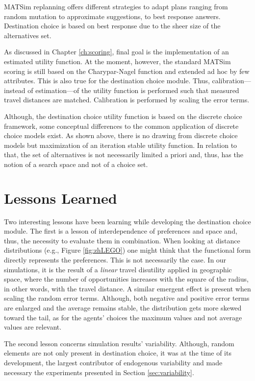 MATSim replanning offers different strategies to adapt plans ranging from random mutation to approximate suggestions, to best response answers. Destination choice is based on best response due to the sheer size of the alternatives set. 

As discussed in Chapter \ref{ch:scoring}, final goal is the implementation of an estimated utility function. At the moment, however, the standard MATSim scoring is still based on the Charypar-Nagel function and extended ad hoc by few attributes. This is also true for the destination choice module. Thus, calibration---instead of estimation---of the utility function is performed such that measured travel distances are matched. Calibration is performed by scaling the error terms. 

Although, the destination choice utility function is based on the discrete choice framework, some conceptual differences to the common application of discrete choice models exist. As shown above, there is no drawing from discrete choice models but maximization of an iteration stable utility function. In relation to that, the set of alternatives is not necessarily limited a priori and, thus, has the notion of a search space and not of a choice set.

\section{Lessons Learned}
Two interesting lessons have been learning while developing the destination choice module. The first is a lesson of interdependence of preferences and space and,  thus, the necessity to evaluate them in combination. When looking at distance distributions (e.g., Figure \ref{fig:zhLEGO}) one might think that the functional form directly represents the preferences. This is not necessarily the case. In our simulations, it is the result of a \emph{linear} travel disutility applied in geographic space, where the number of opportunities increases with the square of the radius, in other words, with the travel distance. A similar emergent effect is present when scaling the random error terms. Although, both negative and positive error terms are enlarged and the average remains stable, the distribution gets more skewed toward the tail, as for the agents' choices the maximum values and not average values are relevant.

The second lesson concerns simulation results' variability. Although, random elements are not only present in destination choice, it was at the time of its development, the largest contributor of endogenous variability and made necessary the experiments presented in Section \ref{sec:variability}.

